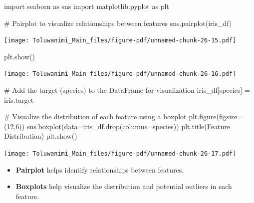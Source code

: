 \documentclass[
  letterpaper,
  DIV=11,
  numbers=noendperiod]{scrreprt}
\newenvironment{Shaded}{\begin{snugshade}}{\end{snugshade}}
\newcommand{\CommentTok}[1]{\textcolor[rgb]{0.37,0.37,0.37}{#1}}
\newcommand{\DecValTok}[1]{\textcolor[rgb]{0.68,0.00,0.00}{#1}}
\newcommand{\ImportTok}[1]{\textcolor[rgb]{0.00,0.46,0.62}{#1}}
\newcommand{\NormalTok}[1]{\textcolor[rgb]{0.00,0.23,0.31}{#1}}
\newcommand{\OperatorTok}[1]{\textcolor[rgb]{0.37,0.37,0.37}{#1}}
\newcommand{\StringTok}[1]{\textcolor[rgb]{0.13,0.47,0.30}{#1}}
\providecommand{\tightlist}{%
  \setlength{\itemsep}{0pt}\setlength{\parskip}{0pt}}\usepackage{longtable,booktabs,array}
\begin{document}
\begin{Shaded}
\begin{Highlighting}[]
\ImportTok{import}\NormalTok{ seaborn }\ImportTok{as}\NormalTok{ sns}
\ImportTok{import}\NormalTok{ matplotlib.pyplot }\ImportTok{as}\NormalTok{ plt}

\CommentTok{\# Pairplot to visualize relationships between features}
\NormalTok{sns.pairplot(iris\_df)}
\end{Highlighting}
\end{Shaded}

\texttt{[image: Toluwanimi\_Main\_files/figure-pdf/unnamed-chunk-26-15.pdf]}

\begin{Shaded}
\begin{Highlighting}[]
\NormalTok{plt.show()}
\end{Highlighting}
\end{Shaded}

\texttt{[image: Toluwanimi\_Main\_files/figure-pdf/unnamed-chunk-26-16.pdf]}

\begin{Shaded}
\begin{Highlighting}[]
\CommentTok{\# Add the target (species) to the DataFrame for visualization}
\NormalTok{iris\_df[}\StringTok{\textquotesingle{}species\textquotesingle{}}\NormalTok{] }\OperatorTok{=}\NormalTok{ iris.target}

\CommentTok{\# Visualize the distribution of each feature using a boxplot}
\NormalTok{plt.figure(figsize}\OperatorTok{=}\NormalTok{(}\DecValTok{12}\NormalTok{,}\DecValTok{6}\NormalTok{))}
\NormalTok{sns.boxplot(data}\OperatorTok{=}\NormalTok{iris\_df.drop(columns}\OperatorTok{=}\StringTok{\textquotesingle{}species\textquotesingle{}}\NormalTok{))}
\NormalTok{plt.title(}\StringTok{\textquotesingle{}Feature Distribution\textquotesingle{}}\NormalTok{)}
\NormalTok{plt.show()}
\end{Highlighting}
\end{Shaded}

\texttt{[image: Toluwanimi\_Main\_files/figure-pdf/unnamed-chunk-26-17.pdf]}

\begin{itemize}
\tightlist
\item
  \textbf{Pairplot} helps identify relationships between features.
\item
  \textbf{Boxplots} help visualize the distribution and potential
  outliers in each feature.
\end{itemize}
\end{document}
